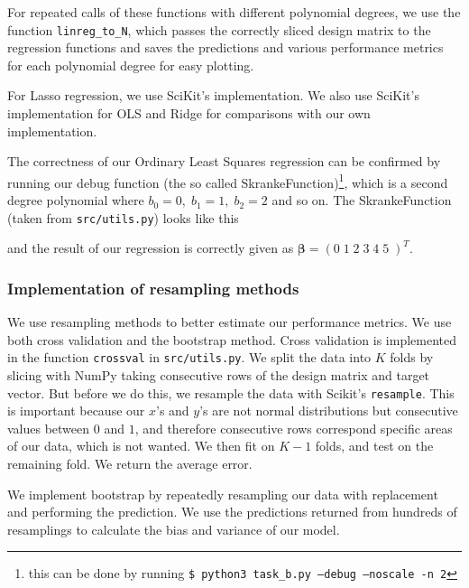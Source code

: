 \documentclass[twocolumn,10pt,cleanfoot]{asme2ej}
\begin{document}


For repeated calls of these functions with different polynomial degrees, we use the function \texttt{linreg\_to\_N}, which passes the correctly sliced design matrix to the regression functions and saves the predictions and various performance metrics for each polynomial degree for easy plotting.

For Lasso regression, we use SciKit's implementation. We also use SciKit's implementation for OLS and Ridge for comparisons with our own implementation.

The correctness of our Ordinary Least Squares regression can be confirmed by running our debug function (the so called SkrankeFunction)\footnote{this can be done by running \texttt{\$ python3 task\_b.py --debug --noscale -n 2}}, which is a second degree polynomial where $b_0 = 0, \; b_1 = 1, \; b_2 = 2$ and so on. The SkrankeFunction (taken from \texttt{src/utils.py}) looks like this



and the result of our regression is correctly given as $\bm{\beta} = (0 \; 1 \; 2 \; 3 \; 4 \; 5\;)^T$.

\subsubsection{Implementation of resampling methods}

We use resampling methods to better estimate our performance metrics. We use both cross validation and the bootstrap method. Cross validation is implemented in the function \texttt{crossval} in \texttt{src/utils.py}. We split the data into $K$ folds by slicing with NumPy taking consecutive rows of the design matrix and target vector. But before we do this, we resample the data with Scikit's \texttt{resample}. This is important because our $x$'s and $y$'s are not normal distributions but consecutive values between $0$ and $1$, and therefore consecutive rows correspond specific areas of our data, which is not wanted. We then fit on $K-1$ folds, and test on the remaining fold. We return the average error.

We implement bootstrap by repeatedly resampling our data with replacement and performing the prediction. We use the predictions returned from hundreds of resamplings to calculate the bias and variance of our model.
\end{document}
